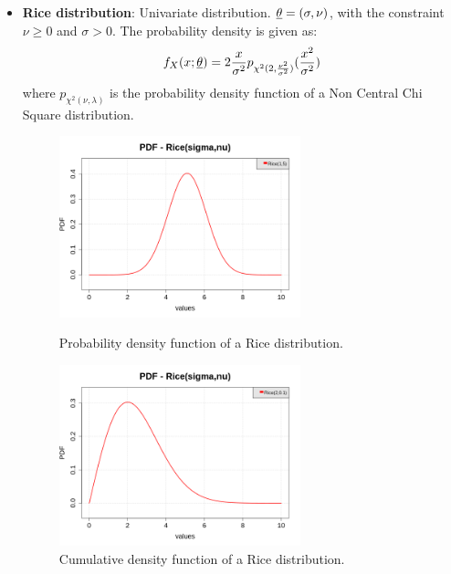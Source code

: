 {\begin{itemize}
\item {\bf Rice distribution}:   Univariate distribution. ${\underline{\theta}} = \left( \sigma, \nu \right)$, with the constraint  $\nu\geq0$ and $\sigma>0$. The probability density is given as:
\begin{equation}
f_X(x;{\underline{\theta}}) = \displaystyle 2\frac{x}{\sigma^2}p_{\chi^2(2,\frac{\nu^2}{\sigma^2})}(\frac{x^2}{\sigma^2})
\end{equation}
where $p_{\chi^2(\nu, \lambda)}$ is the probability density function of a Non Central Chi Square distribution.



\begin{figure}[H]
\begin{minipage}{8cm}
\begin{center}
\includegraphics[width=7cm]{Figures/pdf_Rice_1.png}
\caption{Probability density function of a Rice distribution.}
\end{center}
\end{minipage}
\hfill
\begin{minipage}{8cm}
\begin{center}
\includegraphics[width=7cm]{Figures/pdf_Rice_2.png}
\caption{Cumulative density function of a Rice distribution.}
\end{center}
\end{minipage}
\end{figure}






\end{itemize}}
